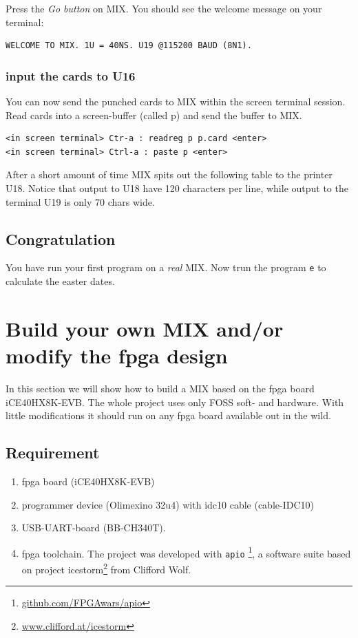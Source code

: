 \documentclass[a4paper,ngerman]{scrartcl}
\begin{document}
Press the \textit{Go button} on MIX. You should see the welcome message on your terminal:
\begin{lstlisting}
WELCOME TO MIX. 1U = 40NS. U19 @115200 BAUD (8N1).                    
\end{lstlisting}

\subsubsection{input the cards to U16}
You can now send the punched cards to MIX within the screen terminal session.
Read cards into a screen-buffer (called p) and send the buffer to MIX.
\begin{lstlisting}[numbers=none,frame=none]
<in screen terminal> Ctr-a : readreg p p.card <enter>
<in screen terminal> Ctrl-a : paste p <enter>
\end{lstlisting}

After a short amount of time MIX spits out the following table to the printer U18. Notice that output to U18 have 120 characters per line, while output to the terminal U19 is only 70 chars wide.


\subsection{Congratulation}
You have run your first program on a \textit{real} MIX.
Now trun the program \lstinline|e| to calculate the easter dates.

\section{Build your own MIX and/or modify the fpga design}

In this section we will show how to build a MIX based on the fpga board iCE40HX8K-EVB. The whole project uses only FOSS soft- and hardware. With little modifications it should run on any fpga board available out in the wild.

\subsection{Requirement}
\begin{enumerate}
	\item 
	fpga board (iCE40HX8K-EVB)
	\item programmer device (Olimexino 32u4) with idc10 cable (cable-IDC10)
	\item USB-UART-board (BB-CH340T).  
	\item fpga toolchain. The project was developed with \lstinline|apio| \footnote{\href{github.com/FPGAwars/apio}{github.com/FPGAwars/apio}}, a software suite based on project icestorm\footnote{\href{www.clifford.at/icestorm}{www.clifford.at/icestorm}} from Clifford Wolf.
\end{enumerate}
\end{document}
